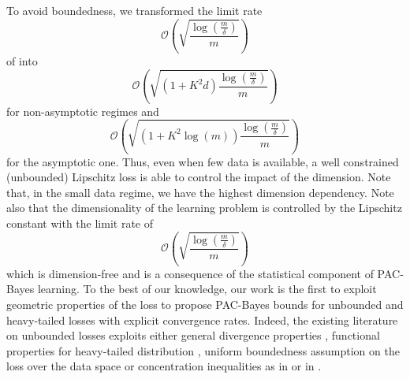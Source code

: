 To avoid boundedness, we transformed the limit rate $$\mathcal{O}\left(\sqrt{\frac{\log\left( \frac{m}{\delta} \right)}{m}}\right)$$ of  into $$\mathcal{O}\left(\sqrt{(1+K^2  d)\frac{\log\left( \frac{m}{\delta} \right)}{m}}\right)$$ for non-asymptotic regimes
and $$\mathcal{O}\left(\sqrt{(1+K^2\log(m))\frac{\log\left( \frac{m}{\delta} \right)}{m}}\right)$$ for the asymptotic one.
Thus, even when few data is available, a well constrained (unbounded) Lipschitz loss is able to control the impact of the dimension.
Note that, in the small data regime, we have the highest dimension dependency. Note also that the dimensionality of the learning problem is controlled by the Lipschitz constant with the limit rate of $$\mathcal{O}\left(\sqrt{\frac{\log\left( \frac{m}{\delta} \right)}{m}}\right)$$ which is dimension-free and is a consequence of the statistical component of PAC-Bayes learning.
To the best of our knowledge, our work is the first to exploit geometric properties of the loss to propose PAC-Bayes bounds for unbounded and heavy-tailed losses with explicit convergence rates. Indeed, the existing literature on unbounded losses exploits either general divergence properties \citep{alquier2018simpler,picard2022change}, functional properties for heavy-tailed distribution \citep{holland2019pac}, uniform boundedness assumption on the loss over the data space \citep{haddouche2021pac} or concentration inequalities as in  or in \citet{kuzborskij2019efron,rivasplata2020pac,jang2023tight}.

